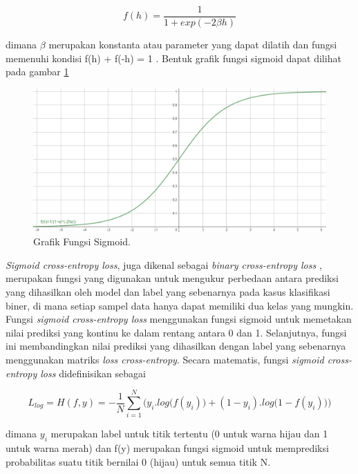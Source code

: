 \begin{equation}
  \label{eq:sigmoid}
  f(h) =  \frac{1}{1+exp(-2 \beta h)} 
\end{equation}

dimana $\beta$ merupakan konstanta atau parameter yang dapat dilatih dan fungsi memenuhi kondisi f(h) + f(-h) = 1 \parencite{sigmoid}. Bentuk grafik fungsi sigmoid dapat dilihat pada gambar \ref{fig:sigmoid}

\begin{figure}[ht]
  \centering
  \includegraphics[scale=0.35]{gambar/sigmoid.png}
  \caption{Grafik Fungsi Sigmoid.}
  \label{fig:sigmoid}
\end{figure}

\emph{Sigmoid cross-entropy loss}, juga dikenal sebagai \emph{binary cross-entropy loss} \parencite{lossFunction}, merupakan fungsi yang digunakan untuk mengukur perbedaan antara prediksi yang dihasilkan oleh model dan label yang sebenarnya pada kasus klasifikasi biner, di mana setiap sampel data hanya dapat memiliki dua kelas yang mungkin. 
Fungsi \emph{sigmoid cross-entropy loss} menggunakan fungsi sigmoid untuk memetakan nilai prediksi yang kontinu ke dalam rentang antara 0 dan 1. 
Selanjutnya, fungsi ini membandingkan nilai prediksi yang dihasilkan dengan label yang sebenarnya menggunakan matriks \emph{loss cross-entropy}. 
Secara matematis, fungsi \emph{sigmoid cross-entropy loss} didefinisikan sebagai 

\begin{equation}
  \label{eq:sigmoidCrossEntropyLoss}
  L_{log} = H(f,y) = - \frac{1}{N}  \sum_ {i=1} ^N  \big( y_{i} . log \big(f( y_{i} ) \big) +(1 - y_{i}) . log \big(1 - f( y_{i} ) \big) \big)  
\end{equation}

dimana $y_{i}$ merupakan label untuk titik tertentu (0 untuk warna hijau dan 1 untuk warna merah) dan f(y) merupakan fungsi sigmoid untuk memprediksi probabilitas suatu titik bernilai 0 (hijau) untuk semua titik N.

